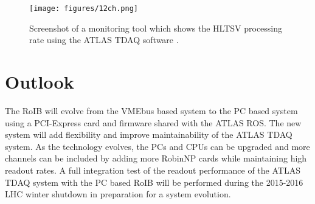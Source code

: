 \begin{figure}[tbp] %
\centering
\texttt{[image: figures/12ch.png]}
\caption{Screenshot of a monitoring tool which shows the HLTSV processing rate using the ATLAS TDAQ software .}
\label{fig:partition}
\end{figure}


\section{Outlook}\label{sec:outlook}

The RoIB will evolve from the VMEbus based system to the PC based system using a PCI-Express card and firmware shared with the 
ATLAS ROS. The new system will add flexibility and improve maintainability of the ATLAS TDAQ system. As the technology 
evolves, the PCs and CPUs can be upgraded and more channels can be included by adding more RobinNP cards while maintaining high 
readout rates. A full integration test of the readout performance of the ATLAS TDAQ system with the PC based RoIB will be performed 
during the 2015-2016 LHC winter shutdown in preparation for a system evolution.







